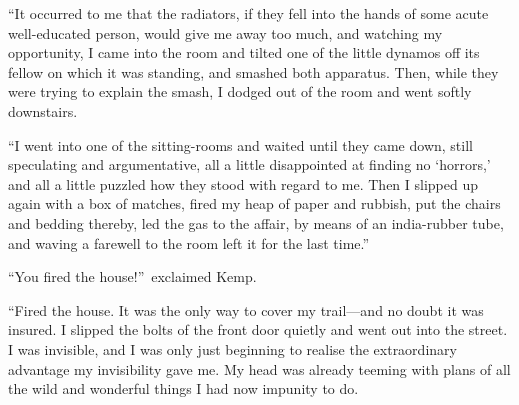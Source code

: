“It occurred to me that the radiators, if they fell into the hands of some acute well-educated person, would give me away too much, and watching my opportunity, I came into the room and tilted one of the little dynamos off its fellow on which it was standing, and smashed both apparatus. Then, while they were trying to explain the smash, I dodged out of the room and went softly downstairs.

“I went into one of the sitting-rooms and waited until they came down, still speculating and argumentative, all a little disappointed at finding no ‘horrors,’ and all a little puzzled how they stood with regard to me. Then I slipped up again with a box of matches, fired my heap of paper and rubbish, put the chairs and bedding thereby, led the gas to the affair, by means of an india-rubber tube, and waving a farewell to the room left it for the last time.”

“You fired the house!”\ exclaimed Kemp.

“Fired the house. It was the only way to cover my trail—and no doubt it was insured. I slipped the bolts of the front door quietly and went out into the street. I was invisible, and I was only just beginning to realise the extraordinary advantage my invisibility gave me. My head was already teeming with plans of all the wild and wonderful things I had now impunity to do.